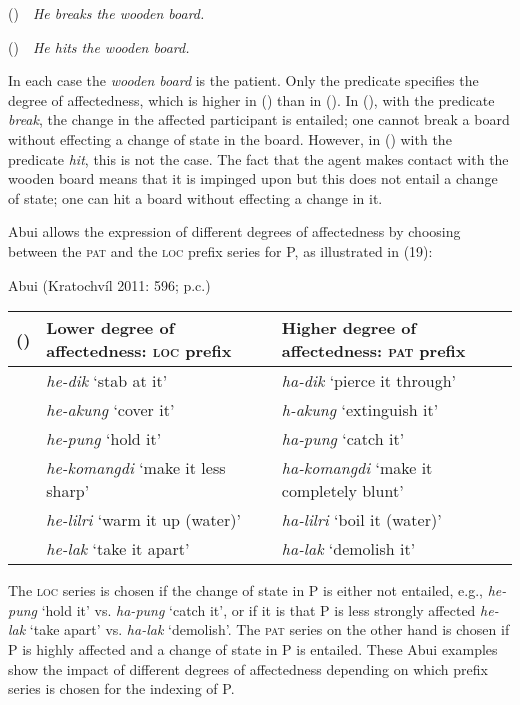 \label{bkm:Ref357868137}()\ \ \textit{He breaks the wooden board.}

\label{bkm:Ref357868148}()\ \ \textit{He hits the wooden board.}

In each case the \textit{wooden board }is the patient. Only the predicate specifies the degree of affectedness, which is higher in () than in (). In (), with the predicate \textit{break}, the change in the affected participant is entailed; one cannot break a board without effecting a change of state in the board. However, in () with the predicate \textit{hit},\textit{ }this is not the case. The fact that the agent makes contact with the wooden board means that it is impinged upon but this does not entail a change of state; one can hit a board without effecting a change in it.

Abui allows the expression of different degrees of affectedness by choosing between the \textsc{pat} and the \textsc{loc} prefix series for P, as illustrated in (19):

Abui (Kratochv\'il 2011: 596; p.c.)

\begin{flushleft}
\tablehead{}
\begin{supertabular}{|m{0.53165984in}|m{2.73236in}|m{2.91776in}|}
\hline
() &
Lower degree of affectedness: \textsc{loc} prefix &
Higher degree of affectedness: \textsc{pat} prefix\\\hline
 &
\textit{he-dik} {\textquoteleft}stab at it{\textquoteright} &
\textit{ha-dik} {\textquoteleft}pierce it through{\textquoteright}\\\hline
 &
\textit{he-akung} {\textquoteleft}cover it{\textquoteright} &
\textit{h-akung} {\textquoteleft}extinguish it{\textquoteright}\\\hline
 &
\textit{he-pung} {\textquoteleft}hold it{\textquoteright} &
\textit{ha-pung} {\textquoteleft}catch it{\textquoteright}\\\hline
 &
\textit{he-komangdi} {\textquoteleft}make it less sharp{\textquoteright} &
\textit{ha-komangdi }{\textquoteleft}make it completely blunt{\textquoteright}\\\hline
 &
\textit{he-lilri }{\textquoteleft}warm it up (water){\textquoteright} &
\textit{ha-lilri }{\textquoteleft}boil it (water){\textquoteright}\\\hline
 &
\textit{he-lak }{\textquoteleft}take it apart{\textquoteright} &
\textit{ha-lak }{\textquoteleft}demolish it{\textquoteright}\\\hline
\end{supertabular}
\end{flushleft}
The \textsc{loc} series is chosen if the change of state in P is either not entailed, e.g., \textit{he-pung} {\textquoteleft}hold it{\textquoteright} vs. \textit{ha-pung} {\textquoteleft}catch it{\textquoteright}, or if it is that P is less strongly affected \textit{he-lak }{\textquoteleft}take apart{\textquoteright} vs. \textit{ha-lak }{\textquoteleft}demolish{\textquoteright}. The \textsc{pat} series on the other hand is chosen if P is highly affected and a change of state in P is entailed. These Abui examples show the impact of different degrees of affectedness depending on which prefix series is chosen for the indexing of P.


